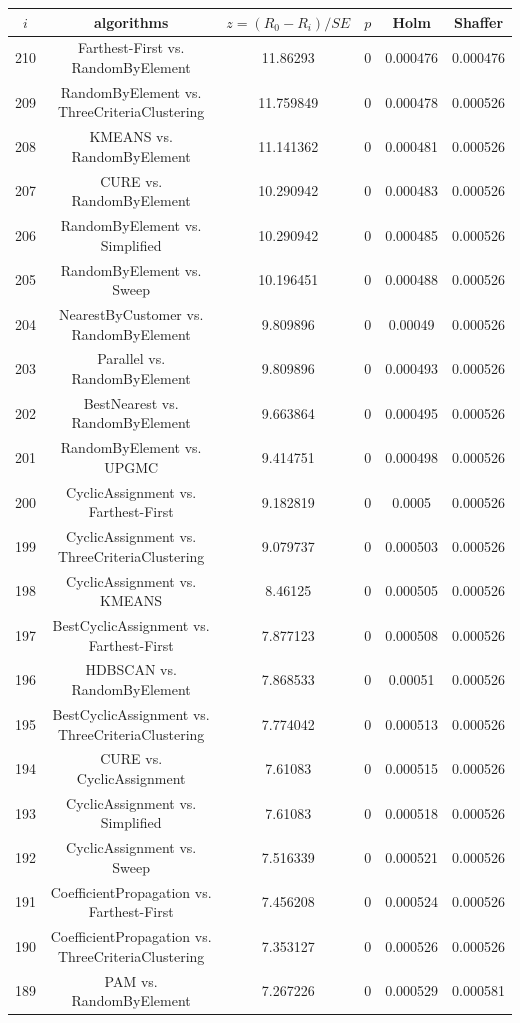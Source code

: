 \documentclass[a4paper,10pt]{article}
\begin{document}
\begin{landscape}
\begin{table}[!htp]
\centering\scriptsize
\begin{tabular}{cccccc}
$i$&algorithms&$z=(R_0 - R_i)/SE$&$p$&Holm&Shaffer\\
\hline210&Farthest-First vs. RandomByElement&11.86293&0&0.000476&0.000476\\
209&RandomByElement vs. ThreeCriteriaClustering&11.759849&0&0.000478&0.000526\\
208&KMEANS vs. RandomByElement&11.141362&0&0.000481&0.000526\\
207&CURE vs. RandomByElement&10.290942&0&0.000483&0.000526\\
206&RandomByElement vs. Simplified&10.290942&0&0.000485&0.000526\\
205&RandomByElement vs. Sweep&10.196451&0&0.000488&0.000526\\
204&NearestByCustomer vs. RandomByElement&9.809896&0&0.00049&0.000526\\
203&Parallel vs. RandomByElement&9.809896&0&0.000493&0.000526\\
202&BestNearest vs. RandomByElement&9.663864&0&0.000495&0.000526\\
201&RandomByElement vs. UPGMC&9.414751&0&0.000498&0.000526\\
200&CyclicAssignment vs. Farthest-First&9.182819&0&0.0005&0.000526\\
199&CyclicAssignment vs. ThreeCriteriaClustering&9.079737&0&0.000503&0.000526\\
198&CyclicAssignment vs. KMEANS&8.46125&0&0.000505&0.000526\\
197&BestCyclicAssignment vs. Farthest-First&7.877123&0&0.000508&0.000526\\
196&HDBSCAN vs. RandomByElement&7.868533&0&0.00051&0.000526\\
195&BestCyclicAssignment vs. ThreeCriteriaClustering&7.774042&0&0.000513&0.000526\\
194&CURE vs. CyclicAssignment&7.61083&0&0.000515&0.000526\\
193&CyclicAssignment vs. Simplified&7.61083&0&0.000518&0.000526\\
192&CyclicAssignment vs. Sweep&7.516339&0&0.000521&0.000526\\
191&CoefficientPropagation vs. Farthest-First&7.456208&0&0.000524&0.000526\\
190&CoefficientPropagation vs. ThreeCriteriaClustering&7.353127&0&0.000526&0.000526\\
189&PAM vs. RandomByElement&7.267226&0&0.000529&0.000581\\

\end{tabular}
\end{table}
\end{landscape}
\end{document}

